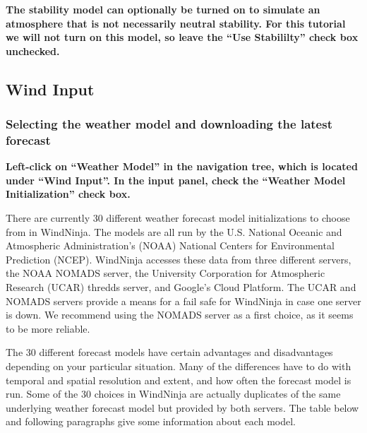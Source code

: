 \documentclass[12pt]{article}
\begin{document}
\textbf{\color{red} The stability model can optionally be turned on to simulate an atmosphere that is not necessarily neutral stability.  
For this tutorial we will not turn on this model, so leave the “Use Stabililty” check box unchecked.}

\subsection{Wind Input}

\subsubsection{Selecting the weather model and downloading the latest forecast}

\textbf{\color{red} Left-click on “Weather Model” in the navigation tree, which is located under  “Wind Input”.  
In the input panel, check the “Weather Model Initialization” check box.}

There are currently 30 different weather forecast model initializations to choose from in WindNinja.  
The models are all run by the U.S. National Oceanic and Atmospheric Administration's (NOAA) National Centers for Environmental Prediction (NCEP).  
WindNinja accesses these data from three different servers, the NOAA NOMADS server, the University Corporation for Atmospheric Research (UCAR) thredds server, and Google's Cloud Platform.  
The UCAR and NOMADS servers provide a means for a fail safe for WindNinja in case one server is down.  
We recommend using the NOMADS server as a first choice, as it seems to be more reliable.

The 30 different forecast models have certain advantages and disadvantages depending on your particular situation.  
Many of the differences have to do with temporal and spatial resolution and extent, and how often the forecast model is run.  
Some of the 30 choices in WindNinja are actually duplicates of the same underlying weather forecast model but provided by both servers.  
The table below and following paragraphs give some information about each model.
\end{document}
